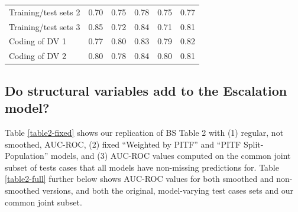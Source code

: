 \documentclass[]{article}
\begin{document}
\begin{table}[t]
\begin{tabular}{lrrrrr}
\hspace{1em}Training/test sets 2 & 0.70 & 0.75 & 0.78 & 0.75 & 0.77\\
\hspace{1em}Training/test sets 3 & 0.85 & 0.72 & 0.84 & 0.71 & 0.81\\
\hspace{1em}Coding of DV 1 & 0.77 & 0.80 & 0.83 & 0.79 & 0.82\\
\hspace{1em}Coding of DV 2 & 0.80 & 0.78 & 0.84 & 0.80 & 0.81\\
\bottomrule
\end{tabular}
\end{table}

\hypertarget{do-structural-variables-add-to-the-escalation-model}{%
\subsection{Do structural variables add to the Escalation
model?}\label{do-structural-variables-add-to-the-escalation-model}}

Table \ref{table2-fixed} shows our replication of BS Table 2 with (1)
regular, not smoothed, AUC-ROC, (2) fixed ``Weighted by PITF'' and
``PITF Split-Population'' models, and (3) AUC-ROC values computed on the
common joint subset of tests cases that all models have non-missing
predictions for. Table \ref{table2-full} further below shows AUC-ROC
values for both smoothed and non-smoothed versions, and both the
original, model-varying test cases sets and our common joint subset.
\end{document}
